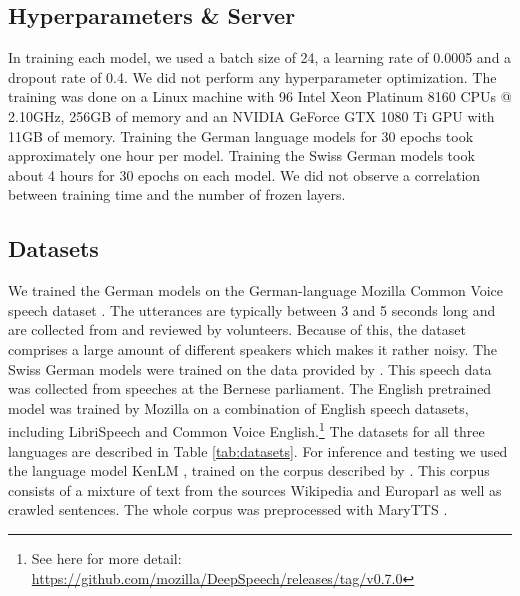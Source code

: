 \documentclass[11pt]{article}
\newcommand{\tz}[1]{\textcolor{red}{\textbf{TZ:} #1}}
\renewcommand{\oe}[1]{\textcolor{magenta}{\textbf{OE:} #1}}
\newcommand{\tz}[1]{}
\renewcommand{\oe}[1]{}
\begin{document}
\subsection{Hyperparameters \& Server}
In training each model, we used a batch size of 24, a learning rate of 0.0005 and a dropout rate of 0.4. We did not perform any hyperparameter optimization. The training was done on a Linux machine with 96 Intel Xeon Platinum 8160 CPUs @ 2.10GHz, 256GB of memory and an NVIDIA GeForce GTX 1080 Ti GPU with 11GB of memory. Training the German language models for 30 epochs took approximately one hour per model. Training the Swiss German models took about 4 hours for 30 epochs on each model. We did not observe a correlation between training time and the number of frozen layers.

\subsection{Datasets}
We trained the German models on the German-language Mozilla Common Voice speech dataset \parencite{DBLP:conf/lrec/ArdilaBDKMHMSTW20}. The utterances are typically between 3 and 5 seconds long and are collected from and reviewed by volunteers. Because of this, the dataset comprises a large amount of different speakers which makes it rather noisy. The Swiss German models were trained on the data provided by \textcite{pluess}. This speech data was collected from speeches at the Bernese parliament. The English pretrained model was trained by Mozilla on a combination of English speech datasets, including LibriSpeech and Common Voice English.\footnote{See here for more detail: \url{https://github.com/mozilla/DeepSpeech/releases/tag/v0.7.0}} The datasets for all three languages are described in Table \ref{tab:datasets}. For inference and testing we used the language model KenLM \parencite{heafield-2011-kenlm}, trained on the corpus described by \textcite[Section~3.2]{Radeck-Arneth2015}. This corpus consists of a mixture of text from the sources Wikipedia and Europarl as well as crawled sentences. The whole corpus was preprocessed with MaryTTS \parencite{schroder2003german}.
\end{document}
